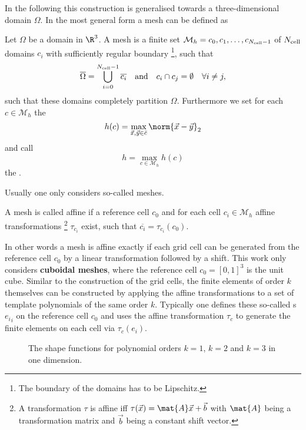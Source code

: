 In the following this construction is generalised
towards a three-dimensional domain $\Omega$.
In the most general form a mesh can be defined as
\begin{defn}[Mesh]
	Let $\Omega$ be a domain in $\R^3$.
	A mesh is a finite set $\mathcal{M}_h = {c_0, c_1, \ldots, c_{N_\text{cell}-1}}$
	of $N_\text{cell}$ domains $c_i$ with sufficiently regular boundary%
	\footnote{The boundary of the domains has to be Lipschitz.},
	such that
	\begin{align*}
		\overline{\Omega} &= \bigcup_{i=0}^{N_\text{cell}-1} \overline{c_i}
		&&\text{and}
		&c_i \cap c_j = \emptyset \quad \forall i \neq j,
	\end{align*}
	\ie such that these domains completely partition $\Omega$.
	Furthermore we set for each $c \in \mathcal{M}_h$
	the 
	\[ h(c) = \max_{\vec{x},\vec{y} \in \bar{c}} \norm{\vec{x}-\vec{y}}_2 \]
	and call
	\[ h = \max_{c \in \mathcal{M}_h} h(c) \]
	the .
\end{defn}
\noindent
Usually one only considers so-called  meshes.
\begin{defn}
	A mesh is called affine if a reference cell $c_0$
	and for each cell $c_i \in \mathcal{M}_h$
	affine transformations%
	\footnote{A transformation $\tau$ is affine iff $\tau(\vec{x}) = \mat{A}\vec{x} + \vec{b}$ with $\mat{A}$ being a transformation matrix and $\vec{b}$ being a constant shift vector.}
	$\tau_{c_i}$ exist,
	such that $\overline{c_i} = \tau_{c_i}(c_0)$.
\end{defn}
In other words a mesh is affine exactly if each
grid cell can be generated from the reference cell $c_0$
by a linear transformation followed by a shift.
This work only considers \textbf{cuboidal meshes},
where the reference cell $c_0 = [0,1]^3$ is the unit cube.
Similar to the construction of the grid cells,
the finite elements of order $k$ themselves
can be constructed by applying the affine transformations
to a set of template polynomials of the same order $k$.
Typically one defines these so-called
s ${e_i}_i$
on the reference cell $c_0$
and uses the affine transformation $\tau_c$
to generate the finite elements on each cell
via $\tau_c(e_i)$.
%
\begin{figure}
	\centering
	\caption[Examples for shape functions in one dimension]{
		The shape functions for polynomial orders $k=1$, $k=2$ and $k=3$
		in one dimension.
	}
	\label{fig:ShapeFunctionsOneD}
\end{figure}
